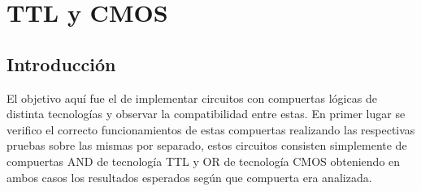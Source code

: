 \chapter{TTL y CMOS}

\section{Introducción}
El objetivo aquí fue el de implementar circuitos con compuertas lógicas de distinta tecnologías y observar la compatibilidad entre estas. 
En primer lugar se verifico el correcto funcionamientos de estas compuertas realizando las respectivas pruebas sobre las mismas por separado, estos circuitos consisten simplemente de compuertas AND de tecnología TTL y OR de tecnología CMOS obteniendo en ambos casos los resultados esperados según que compuerta era analizada.
